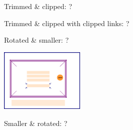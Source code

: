 \documentclass[12pt]{article}
\begin{document}
\vspace{4cm}
Trimmed \& clipped: ?

\fboxsep=0pt\relax
{}

\vspace{4cm}
Trimmed \& clipped with clipped links: ?

\fboxsep=0pt\relax
{}


\clearpage

Rotated \& smaller: ?

\includegraphics[angle=10,width=4cm]{anothertestgraphics}

Smaller \& rotated: ?
\end{document}
